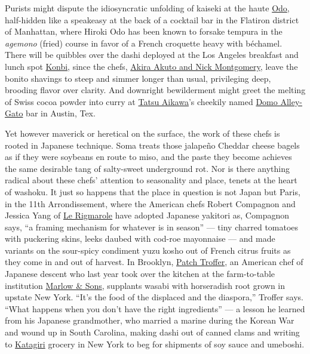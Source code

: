 Purists might dispute the idiosyncratic unfolding of kaiseki at the
haute \href{https://www.odo.nyc/}{Odo}, half-hidden like a speakeasy at
the back of a cocktail bar in the Flatiron district of Manhattan, where
Hiroki Odo has been known to forsake tempura in the \emph{agemono}
(fried) course in favor of a French croquette heavy with béchamel. There
will be quibbles over the dashi deployed at the Los Angeles breakfast
and lunch spot \href{https://konbila.com/}{Konbi}, since the chefs,
\href{https://www.nytimes3xbfgragh.onion/2019/01/28/dining/konbi-egg-salad-sandwich-instagram.html}{Akira
Akuto and Nick Montgomery}, leave the bonito shavings to steep and
simmer longer than usual, privileging deep, brooding flavor over
clarity. And downright bewilderment might greet the melting of Swiss
cocoa powder into curry at
\href{https://www.nytimes3xbfgragh.onion/2018/04/30/dining/austin-texas-japanese-restaurants.html}{Tatsu
Aikawa}'s cheekily named \href{https://domo-tatsuya.com/}{Domo
Alley-Gato} bar in Austin, Tex.

Yet however maverick or heretical on the surface, the work of these
chefs is rooted in Japanese technique. Soma treats those jalapeño
Cheddar cheese bagels as if they were soybeans en route to miso, and the
paste they become achieves the same desirable tang of salty-sweet
underground rot. Nor is there anything radical about these chefs'
attention to seasonality and place, tenets at the heart of washoku. It
just so happens that the place in question is not Japan but Paris, in
the 11th Arrondissement, where the American chefs Robert Compagnon and
Jessica Yang of \href{https://www.lerigmarole.com/}{Le Rigmarole} have
adopted Japanese yakitori as, Compagnon says, ``a framing mechanism for
whatever is in season'' --- tiny charred tomatoes with puckering skins,
leeks daubed with cod-roe mayonnaise --- and made variants on the
sour-spicy condiment yuzu kosho out of French citrus fruits as they come
in and out of harvest. In Brooklyn,
\href{https://www.nytimes3xbfgragh.onion/2018/10/31/magazine/how-to-cook-all-the-mushrooms.html}{Patch
Troffer}, an American chef of Japanese descent who last year took over
the kitchen at the farm-to-table institution
\href{http://marlowandsons.com/}{Marlow \& Sons}, supplants wasabi with
horseradish root grown in upstate New York. ``It's the food of the
displaced and the diaspora,'' Troffer says. ``What happens when you
don't have the right ingredients'' --- a lesson he learned from his
Japanese grandmother, who married a marine during the Korean War and
wound up in South Carolina, making dashi out of canned clams and writing
to \href{http://katagiri.com/}{Katagiri} grocery in New York to beg for
shipments of soy sauce and umeboshi.

